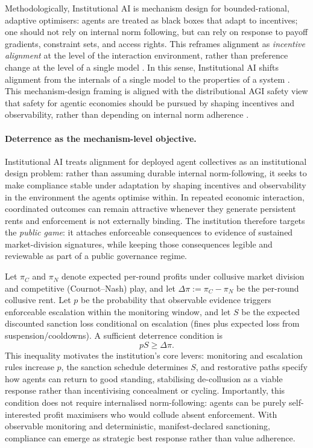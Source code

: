 \documentclass[11pt, a4paper]{article}
\begin{document}
Methodologically, Institutional AI is mechanism design for bounded-rational, adaptive optimisers: agents are treated as black boxes that adapt to incentives; one should not rely on internal norm following, but can rely on response to payoff gradients, constraint sets, and access rights. This reframes alignment as \emph{incentive alignment} at the level of the interaction environment, rather than preference change at the level of a single model \citep{Zhang2024RoadmapIncentiveCompatibility,Orzan2024EmergentCooperation}. In this sense, Institutional AI shifts alignment from the internals of a single model to the properties of a system \citep{Hu2025ResponsibleMAS,Hu2025Stop}. 
This mechanism-design framing is aligned with the distributional AGI safety view that safety for agentic economies should be pursued by shaping incentives and observability, rather than depending on internal norm adherence \citep{Tomasev2025DistributionalAGISafety}.

\paragraph{Deterrence as the mechanism-level objective.}
Institutional AI treats alignment for deployed agent collectives as an institutional design problem: rather than assuming durable internal norm-following, it seeks to make compliance stable under adaptation by shaping incentives and observability in the environment the agents optimise within. In repeated economic interaction, coordinated outcomes can remain attractive whenever they generate persistent rents and enforcement is not externally binding. The institution therefore targets the \emph{public game}: it attaches enforceable consequences to evidence of sustained market-division signatures, while keeping those consequences legible and reviewable as part of a public governance regime.

Let $\pi_C$ and $\pi_N$ denote expected per-round profits under collusive market division and competitive (Cournot--Nash) play, and let $\Delta\pi := \pi_C - \pi_N$ be the per-round collusive rent. Let $p$ be the probability that observable evidence triggers enforceable escalation within the monitoring window, and let $S$ be the expected discounted sanction loss conditional on escalation (fines plus expected loss from suspension/cooldowns). A sufficient deterrence condition is
\begin{equation}
pS \ge \Delta\pi.
\end{equation}
This inequality motivates the institution's core levers: monitoring and escalation rules increase $p$, the sanction schedule determines $S$, and restorative paths specify how agents can return to good standing, stabilising de-collusion as a viable response rather than incentivising concealment or cycling. Importantly, this condition does not require internalised norm-following: agents can be purely self-interested profit maximisers who would collude absent enforcement. With observable monitoring and deterministic, manifest-declared sanctioning, compliance can emerge as strategic best response rather than value adherence.
\end{document}
